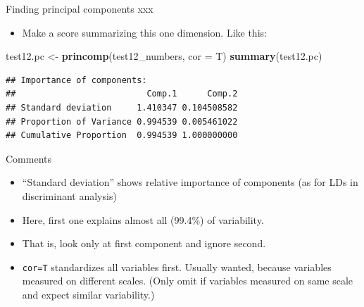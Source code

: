 \documentclass[ignorenonframetext,]{beamer}
\newenvironment{Shaded}{\begin{snugshade}}{\end{snugshade}}
\newcommand{\DataTypeTok}[1]{\textcolor[rgb]{0.13,0.29,0.53}{#1}}
\newcommand{\KeywordTok}[1]{\textcolor[rgb]{0.13,0.29,0.53}{\textbf{#1}}}
\newcommand{\NormalTok}[1]{#1}
\newcommand{\StringTok}[1]{\textcolor[rgb]{0.31,0.60,0.02}{#1}}
\providecommand{\tightlist}{%
  \setlength{\itemsep}{0pt}\setlength{\parskip}{0pt}}
\begin{document}
\begin{frame}[fragile]{Finding principal components xxx}
\protect\hypertarget{finding-principal-components-xxx}{}

\begin{itemize}
\tightlist
\item
  Make a score summarizing this one dimension. Like this:
\end{itemize}

\begin{Shaded}
\begin{Highlighting}[]
\NormalTok{test12.pc <-}\StringTok{ }\KeywordTok{princomp}\NormalTok{(test12_numbers, }\DataTypeTok{cor =}\NormalTok{ T)}
\KeywordTok{summary}\NormalTok{(test12.pc)}
\end{Highlighting}
\end{Shaded}

\begin{verbatim}
## Importance of components:
##                          Comp.1      Comp.2
## Standard deviation     1.410347 0.104508582
## Proportion of Variance 0.994539 0.005461022
## Cumulative Proportion  0.994539 1.000000000
\end{verbatim}

\end{frame}

\begin{frame}[fragile]{Comments}
\protect\hypertarget{comments}{}

\begin{itemize}
\item
  ``Standard deviation'' shows relative importance of components (as for
  LDs in discriminant analysis)
\item
  Here, first one explains almost all (99.4\%) of variability.
\item
  That is, look only at first component and ignore second.
\item
  \texttt{cor=T} standardizes all variables first. Usually wanted,
  because variables measured on different scales. (Only omit if
  variables measured on same scale and expect similar variability.)
\end{itemize}

\end{frame}
\end{document}
